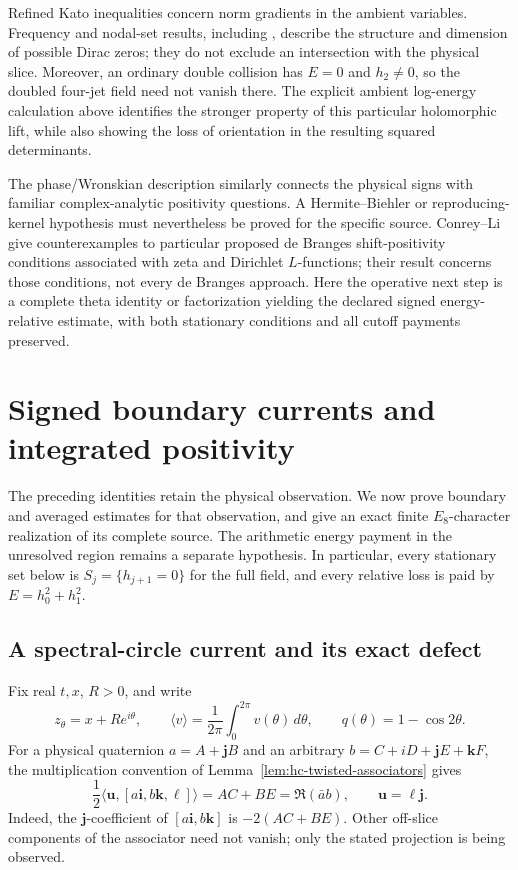 \documentclass[11pt]{article}
\numberwithin{equation}{section}
\theoremstyle{definition}
\theoremstyle{remark}
\newcommand{\ii}{\mathbf i}
\newcommand{\jj}{\mathbf j}
\newcommand{\kk}{\mathbf k}
\newcommand{\dd}{\,d}
\begin{document}
Refined Kato inequalities \cite{feehan} concern norm gradients in the
ambient variables.  Frequency and nodal-set results, including
\cite{borrelliwu26}, describe the structure and dimension of possible
Dirac zeros; they do not exclude an intersection with the physical
slice.  Moreover, an ordinary double collision has $E=0$ and $h_2\ne0$,
so the doubled four-jet field need not vanish there.  The explicit
ambient log-energy calculation above identifies the stronger property
of this particular holomorphic lift, while also showing the loss of
orientation in the resulting squared determinants.

The phase/Wronskian description similarly connects the physical signs
with familiar complex-analytic positivity questions.  A Hermite--Biehler
or reproducing-kernel hypothesis must nevertheless be proved for the
specific source.  Conrey--Li \cite{conreyli} give counterexamples to
particular proposed de Branges shift-positivity conditions associated
with zeta and Dirichlet $L$-functions; their result concerns those
conditions, not every de Branges approach.  Here the operative next step
is a complete theta identity or factorization yielding the declared
signed energy-relative estimate, with both stationary conditions and
all cutoff payments preserved.

\section{Signed boundary currents and integrated positivity}
\label{sf:section}

The preceding identities retain the physical observation.  We now prove
boundary and averaged estimates for that observation, and give an exact
finite \(E_8\)-character realization of its complete source.  The
arithmetic energy payment in the unresolved region remains a separate
hypothesis.  In particular, every stationary set below is
\(S_j=\{h_{j+1}=0\}\) for the full field, and every relative loss is paid
by \(E=h_0^2+h_1^2\).

\subsection{A spectral-circle current and its exact defect}

Fix real \(t,x\), \(R>0\), and write
\[
 z_\theta=x+Re^{i\theta},\qquad
 \langle v\rangle=\frac1{2\pi}\int_0^{2\pi}v(\theta)\dd\theta,\qquad
 q(\theta)=1-\cos2\theta.
\]
For a physical quaternion \(a=A+\jj B\) and an arbitrary
\(b=C+iD+\jj E+\kk F\), the multiplication convention of
Lemma~\ref{lem:hc-twisted-associators} gives
\[
 \frac12\langle\mathbf u,[a\ii,b\kk,\ell]\rangle=AC+BE
                 =\Re(\bar a b),\qquad\mathbf u=\ell\jj .
\]
Indeed, the \(\jj\)-coefficient of \([a\ii,b\kk]\) is
\(-2(AC+BE)\).  Other off-slice components of the associator need not
vanish; only the stated projection is being observed.
\end{document}
